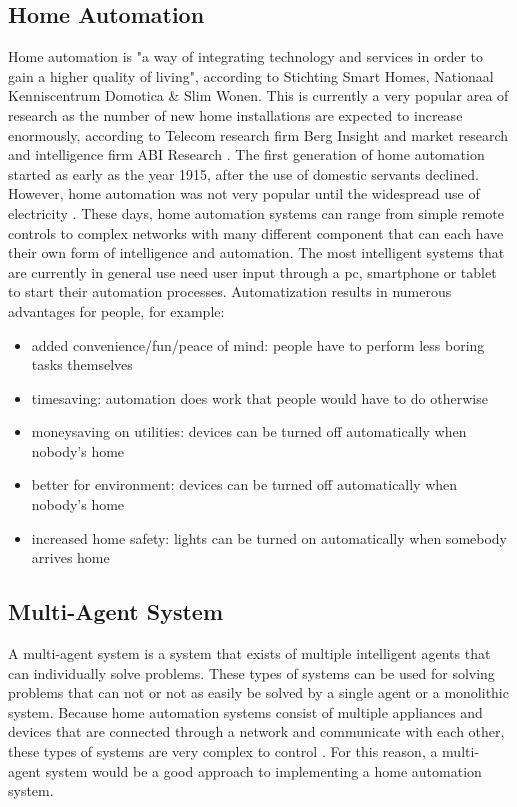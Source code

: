 \documentclass{sig-alternate-br}
\begin{document}
\subsection{Home Automation}
Home automation is "a way of integrating technology and services in order to gain a higher quality of living", according to Stichting Smart Homes, Nationaal Kenniscentrum Domotica \& Slim Wonen. This is currently a very popular area of research as the number of new home installations are expected to increase enormously, according to Telecom research firm Berg Insight \cite{berginsight} and market research and intelligence firm ABI Research \cite{abi}. The first generation of home automation started as early as the year 1915, after the use of domestic servants declined. However, home automation was not very popular until the widespread use of electricity \cite{harper}. These days, home automation systems can range from simple remote controls to complex networks with many different component that can each have their own form of intelligence and automation. The most intelligent systems that are currently in general use need user input through a pc, smartphone or tablet to start their automation processes. Automatization results in numerous advantages for people, for example:
\begin{itemize}
\item added convenience/fun/peace of mind: people have to perform less boring tasks themselves
\item timesaving: automation does work that people would have to do otherwise
\item moneysaving on utilities: devices can be turned off automatically when nobody's home
\item better for environment: devices can be turned off automatically when nobody's home
\item increased home safety: lights can be turned on automatically when somebody arrives home
\end{itemize}
\subsection{Multi-Agent System}
A multi-agent system is a system that exists of multiple intelligent agents that can individually solve problems. These types of systems can be used for solving problems that can not or not as easily be solved by a single agent or a monolithic system. Because home automation systems consist of multiple appliances and devices that are connected through a network and communicate with each other, these types of systems are very complex to control \cite{mast}. For this reason, a multi-agent system would be a good approach to implementing a home automation system.
\end{document}
